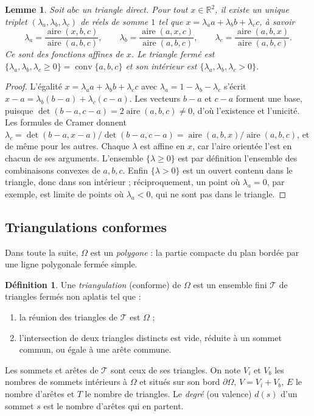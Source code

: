 \documentclass[11pt,a4paper]{article}
\theoremstyle{plain}
\newtheorem{lemme}[theoreme]{Lemme}
\theoremstyle{definition}
\newtheorem{definition}[theoreme]{Définition}
\theoremstyle{remark}
\newcommand{\R}{\mathbb{R}}
\DeclareMathOperator{\conv}{conv}
\DeclareMathOperator{\aire}{aire}
\begin{document}
\begin{lemme}\label{lem:barycentriques}
Soit $abc$ un triangle direct. Pour tout $x\in\R^2$, il existe un unique triplet $(\lambda_a,\lambda_b,\lambda_c)$ de réels de somme $1$ tel que $x=\lambda_aa+\lambda_bb+\lambda_cc$, à savoir
\[
  \lambda_a=\frac{\aire(x,b,c)}{\aire(a,b,c)},\qquad
  \lambda_b=\frac{\aire(a,x,c)}{\aire(a,b,c)},\qquad
  \lambda_c=\frac{\aire(a,b,x)}{\aire(a,b,c)}.
\]
Ce sont des fonctions affines de $x$. Le triangle fermé est $\{\lambda_a,\lambda_b,\lambda_c\geq0\}=\conv\{a,b,c\}$ et son intérieur est $\{\lambda_a,\lambda_b,\lambda_c>0\}$.
\end{lemme}

\begin{proof}
L'égalité $x=\lambda_aa+\lambda_bb+\lambda_cc$ avec $\lambda_a=1-\lambda_b-\lambda_c$ s'écrit $x-a=\lambda_b(b-a)+\lambda_c(c-a)$. Les vecteurs $b-a$ et $c-a$ forment une base, puisque $\det(b-a,c-a)=2\aire(a,b,c)\neq0$, d'où l'existence et l'unicité. Les formules de Cramer donnent $\lambda_c=\det(b-a,x-a)/\det(b-a,c-a)=\aire(a,b,x)/\aire(a,b,c)$, et de même pour les autres. Chaque $\lambda$ est affine en $x$, car l'aire orientée l'est en chacun de ses arguments. L'ensemble $\{\lambda\geq0\}$ est par définition l'ensemble des combinaisons convexes de $a,b,c$. Enfin $\{\lambda>0\}$ est un ouvert contenu dans le triangle, donc dans son intérieur ; réciproquement, un point où $\lambda_a=0$, par exemple, est limite de points où $\lambda_a<0$, qui ne sont pas dans le triangle.
\end{proof}

\subsection{Triangulations conformes}

Dans toute la suite, $\Omega$ est un \emph{polygone} : la partie compacte du plan bordée par une ligne polygonale fermée simple.

\begin{definition}\label{def:triangulation}
Une \emph{triangulation} (conforme) de $\Omega$ est un ensemble fini $\mathcal T$ de triangles fermés non aplatis tel que :
\begin{enumerate}[nosep]
\item la réunion des triangles de $\mathcal T$ est $\Omega$ ;
\item l'intersection de deux triangles distincts est vide, réduite à un sommet commun, ou égale à une arête commune.
\end{enumerate}
Les sommets et arêtes de $\mathcal T$ sont ceux de ses triangles. On note $V_i$ et $V_b$ les nombres de sommets intérieurs à $\Omega$ et situés sur son bord $\partial\Omega$, $V=V_i+V_b$, $E$ le nombre d'arêtes et $T$ le nombre de triangles. Le \emph{degré} (ou valence) $d(s)$ d'un sommet $s$ est le nombre d'arêtes qui en partent.
\end{definition}
\end{document}
